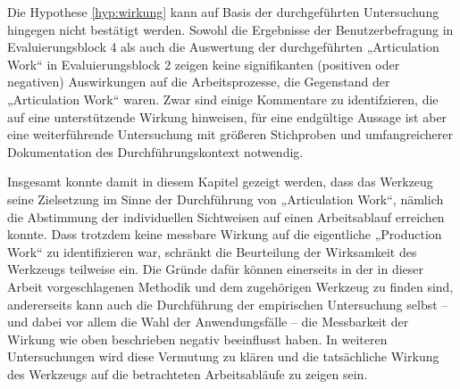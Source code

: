Die Hypothese \ref{hyp:wirkung} kann auf Basis der durchgeführten Untersuchung hingegen nicht bestätigt werden. Sowohl die Ergebnisse der Benutzerbefragung in Evaluierungsblock 4 als auch die Auswertung der durchgeführten „Articulation Work“ in Evaluierungsblock 2 zeigen keine signifikanten (positiven oder negativen) Auswirkungen auf die Arbeitsprozesse, die Gegenstand der „Articulation Work“ waren. Zwar sind einige Kommentare zu identifzieren, die auf eine unterstützende Wirkung hinweisen, für eine endgültige Aussage ist aber eine weiterführende Untersuchung mit größeren Stichproben und umfangreicherer Dokumentation des Durchführungskontext notwendig. 

Insgesamt konnte damit in diesem Kapitel gezeigt werden, dass das Werkzeug seine Zielsetzung im Sinne der Durchführung von „Articulation Work“, nämlich die Abstimmung der individuellen Sichtweisen auf einen Arbeitsablauf erreichen konnte. Dass trotzdem keine messbare Wirkung auf die eigentliche „Production Work“ zu identifizieren war, schränkt die Beurteilung der Wirksamkeit des Werkzeugs teilweise ein. Die Gründe dafür können einerseits in der in dieser Arbeit vorgeschlagenen Methodik und dem zugehörigen Werkzeug zu finden sind, andererseits kann auch die Durchführung der empirischen Untersuchung selbst -- und dabei vor allem die Wahl der Anwendungsfälle -- die Messbarkeit der Wirkung wie oben beschrieben negativ beeinflusst haben. In weiteren Untersuchungen wird diese Vermutung zu klären und die tatsächliche Wirkung des Werkzeugs auf die betrachteten Arbeitsabläufe zu zeigen sein.

